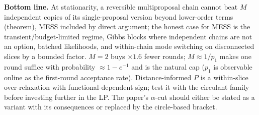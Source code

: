 \documentclass[11pt,a4paper]{article}
\theoremstyle{remark}
\begin{document}
\textbf{Bottom line.} At stationarity, a reversible multiproposal chain cannot beat $M$ independent copies of its single-proposal version beyond lower-order terms (theorem), MESS included by direct argument; the honest case for MESS is the transient/budget-limited regime, Gibbs blocks where independent chains are not an option, batched likelihoods, and within-chain mode switching on disconnected slices by a bounded factor. $M=2$ buys $\times1.6$ fewer rounds; $M\approx1/p_1$ makes one round suffice with probability $\approx1-e^{-1}$ and is the natural cap ($p_1$ is observable online as the first-round acceptance rate). Distance-informed $P$ is a within-slice over-relaxation with functional-dependent sign; test it with the circulant family before investing further in the LP. The paper's $\alpha$-cut should either be stated as a variant with its consequences or replaced by the circle-based bracket.

\end{document}
